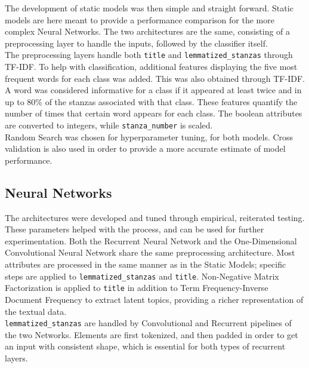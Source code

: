 The development of static models was then simple and straight forward.
Static models are here meant to provide a performance comparison
for the more complex Neural Networks.
The two architectures are the same, consisting of a preprocessing
layer to handle the inputs, followed by the classifier itself.\\

The preprocessing layers handle both \texttt{title} and
\texttt{lemmatized\_stanzas} through TF-IDF. 
To help with classification, additional features displaying the five most
frequent words for each class was added.
This was also obtained through TF-IDF.
A word was considered informative for a class if it appeared at
least twice and in up to 80\% of the stanzas associated with that class.
These features quantify the number of times that certain word appears for each
class.
% 
% 
The boolean attributes are converted to integers, while \texttt{stanza\_number}
is scaled.\\

Random Search was chosen for hyperparameter tuning, for both models.
Cross validation is also used in order to provide a more accurate
estimate of model performance.

\subsection*{Neural Networks}
The architectures were developed and tuned through empirical,
reiterated testing. These parameters helped with the process, and can
be used for further experimentation.
Both the Recurrent Neural Network and the One-Dimensional Convolutional
Neural Network share the same preprocessing
architecture. Most attributes are processed in the same manner as in
the Static Models; specific steps are applied to \texttt{lemmatized\_stanzas}
and \texttt{title}.
Non-Negative Matrix Factorization is applied to \texttt{title} in addition to
Term Frequency-Inverse Document Frequency
to extract latent topics, providing a richer representation of the
textual data.\\

\texttt{lemmatized\_stanzas} are handled by Convolutional and Recurrent
pipelines of the two Networks.
Elements are first tokenized, and then padded in order to
get an input with consistent shape, which is essential for both types of
recurrent layers.\\

